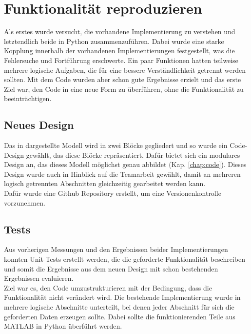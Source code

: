 \documentclass[../Report.tex]{subfiles}
\begin{document}
\section[Funktionalität reproduzieren]{Funktionalität reproduzieren}
\label{sec:vorg.reproduktion}
Als erstes wurde versucht, die vorhandene Implementierung zu verstehen und letztendlich beide in Python zusammenzuführen. Dabei wurde eine starke Kopplung innerhalb der vorhandenen Implementierungen festgestellt, was die Fehlersuche und Fortführung erschwerte. Ein paar Funktionen hatten teilweise mehrere logische Aufgaben, die für eine bessere Verständlichkeit getrennt werden sollten. Mit dem Code wurden aber schon gute Ergebnisse erzielt und das erste Ziel war, den Code in eine neue Form zu überführen, ohne die Funktionalität zu beeinträchtigen.
\subsection*{Neues Design}
\label{sec:vorg.design}
Das in  dargestellte Modell wird in zwei Blöcke gegliedert und so wurde ein Code-Design gewählt, das diese Blöcke repräsentiert. Dafür bietet sich ein modulares Design an, das dieses Modell möglichst genau abbildet (Kap. \ref{chap:code}). Dieses Design wurde auch in Hinblick auf die Teamarbeit gewählt, damit an mehreren logisch getrennten Abschnitten gleichzeitig gearbeitet werden kann. \\ Dafür wurde eine Github Repository erstellt, um eine Versionenkontrolle vorzunehmen.
\subsection*{Tests}
\label{sec:vorg.tests}
Aus vorherigen Messungen und den Ergebnissen beider Implementierungen konnten Unit-Tests erstellt werden, die die geforderte Funktionalität beschreiben und somit die Ergebnisse aus dem neuen Design mit schon bestehenden Ergebnissen evaluieren. \\ Ziel war es, den Code umzustrukturieren mit der Bedingung, dass die Funktionalität nicht verändert wird. Die bestehende Implementierung wurde in mehrere logische Abschnitte unterteilt, bei denen jeder Abschnitt für sich die geforderten Daten erzeugen sollte. Dabei sollte die funktionierenden Teile aus MATLAB in Python überführt werden.
\end{document}
